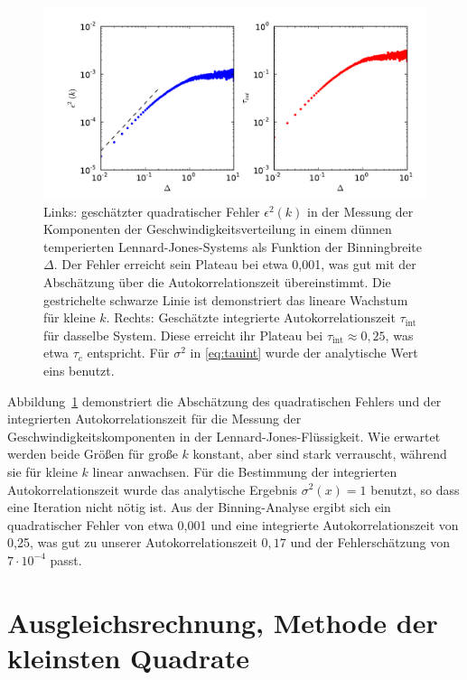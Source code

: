 \begin{figure}
  \centering
  \includegraphics[width=\textwidth]{plots/binning}
  \caption{Links: geschätzter quadratischer Fehler $\epsilon^2(k)$ in
    der Messung der Komponenten der Geschwindigkeitsverteilung in
    einem dünnen temperierten Lennard-Jones-Systems als Funktion der
    Binningbreite $\Delta$. Der Fehler erreicht sein Plateau bei etwa
    0,001, was gut mit der Abschätzung über die Autokorrelationszeit
    übereinstimmt.  Die gestrichelte schwarze Linie ist demonstriert
    das lineare Wachstum für kleine $k$. Rechts: Geschätzte
    integrierte Autokorrelationszeit $\tau_\text{int}$ für dasselbe
    System.  Diese erreicht ihr Plateau bei $\tau_\text{int} \approx
    0,25$, was etwa $\tau_c$ entspricht. Für $\sigma^2$ in
    \eqref{eq:tauint} wurde der analytische Wert eins benutzt. }
  \label{fig:binning}
\end{figure}

Abbildung~\ref{fig:binning} demonstriert die Abschätzung des
quadratischen Fehlers und der integrierten Autokorrelationszeit für
die Messung der Geschwindigkeitskomponenten in der
Lennard-Jones-Flüssigkeit. Wie erwartet werden beide Größen für große
$k$ konstant, aber sind stark verrauscht, während sie für kleine $k$
linear anwachsen.  Für die Bestimmung der integrierten
Autokorrelationszeit wurde das analytische Ergebnis $\sigma^2(x)=1$
benutzt, so dass eine Iteration nicht nötig ist. Aus der
Binning-Analyse ergibt sich ein quadratischer Fehler von etwa 0,001
und eine integrierte Autokorrelationszeit von 0,25, was gut zu unserer
Autokorrelationszeit $0,17$ und der Fehlerschätzung von $7\cdot
10^{-4}$ passt.

\section{Ausgleichsrechnung, Methode der kleinsten Quadrate}


